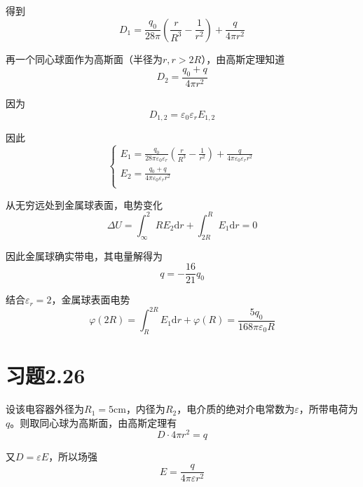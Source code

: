 \documentclass{SCIS2020cn}
\begin{document}
得到
\begin{equation}
    D_1=\frac{q_0}{28\pi}\left(\frac{r}{R^3}-\frac{1}{r^2}\right)+\frac{q}{4\pi{}r^2}
\end{equation}

再一个同心球面作为高斯面（半径为$r,r>2R$），由高斯定理知道
\begin{equation}
    D_2=\frac{q_0+q}{4\pi{}r^2}
\end{equation}

因为
\begin{equation}
    D_{1,2}=\varepsilon_0\varepsilon_rE_{1,2}
\end{equation}

因此
\begin{equation}
    \begin{cases}
        \displaystyle{}E_1=\frac{q_0}{28\pi\varepsilon_0\varepsilon_r}\left(\frac{r}{R^3}-\frac{1}{r^2}\right)+\frac{q}{4\pi\varepsilon_0\varepsilon_r{}r^2}\\
        \displaystyle{}E_2=\frac{q_0+q}{4\pi\varepsilon_0\varepsilon_r{}r^2}\\
    \end{cases}
\end{equation}

从无穷远处到金属球表面，电势变化
\begin{equation}
    \Delta{}U=\int_{\infty}^2RE_2\text{d}r+\int_{2R}^RE_1\text{d}r=0
\end{equation}

因此金属球确实带电，其电量解得为
\begin{equation}
    q=-\frac{16}{21}q_0
\end{equation}

结合$\varepsilon_r=2$，金属球表面电势
\begin{equation}
    \varphi(2R)=\int_R^{2R}E_1\text{d}r+\varphi(R)=\frac{5q_0}{168\pi\varepsilon_0R}
\end{equation}
\section{习题2.26}
设该电容器外径为$R_1=5\text{cm}$，内径为$R_2$，电介质的绝对介电常数为$\varepsilon$，所带电荷为$q$。则取同心球为高斯面，由高斯定理有
\begin{equation}
    D·4\pi{}r^2=q
\end{equation}

又$D=\varepsilon{}E$，所以场强
\begin{equation}
    E=\frac{q}{4\pi\varepsilon{}r^2}
\end{equation}
\end{document}
